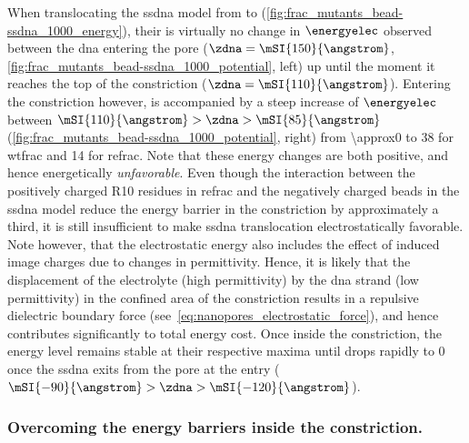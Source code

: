 When translocating the \gls{ssdna} model from \cisi{} to \transi{}
(\cref{fig:frac_mutants_bead-ssdna_1000_energy}), their is virtually no change in $\energyelec$ observed
between the \gls{dna} entering the pore ($\zdna = \mSI{150}{\angstrom}$,
\cref{fig:frac_mutants_bead-ssdna_1000_potential}, left) up until the moment it reaches the top of the
constriction ($\zdna = \mSI{110}{\angstrom}$). Entering the constriction however, is accompanied by a steep
increase of $\energyelec$ between $ \mSI{110}{\angstrom} > \zdna > \mSI{85}{\angstrom}$
(\cref{fig:frac_mutants_bead-ssdna_1000_potential}, right) from \SI{\approx0}{\kT} to \SI{38}{\kT} for
\gls{wtfrac} and \SI{14}{\kT} for \gls{refrac}. Note that these energy changes are both positive, and hence
energetically \emph{unfavorable}. Even though the interaction between the positively charged R10 residues in
\gls{refrac} and the negatively charged beads in the \gls{ssdna} model reduce the energy barrier in the
constriction by approximately a third, it is still insufficient to make \gls{ssdna} translocation
electrostatically favorable. Note however, that the electrostatic energy also includes the effect of induced
image charges due to changes in permittivity. Hence, it is likely that the displacement of the electrolyte
(high permittivity) by the \gls{dna} strand (low permittivity) in the confined area of the constriction
results in a repulsive dielectric boundary force (see~\cref{eq:nanopores_electrostatic_force}), and hence
contributes significantly to total energy cost. Once inside the constriction, the energy level remains stable
at their respective maxima until drops rapidly to \SI{0}{\kT} once the \gls{ssdna} exits from the pore at the
\transi{} entry ($\mSI{-90}{\angstrom} > \zdna > \mSI{-120}{\angstrom}$). 


\subsubsection{Overcoming the energy barriers inside the constriction.}
%

